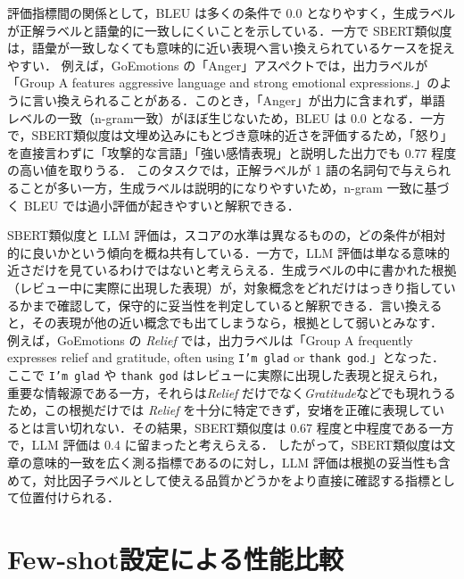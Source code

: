 評価指標間の関係として，BLEU は多くの条件で 0.0 となりやすく，生成ラベルが正解ラベルと語彙的に一致しにくいことを示している．一方で SBERT類似度は，語彙が一致しなくても意味的に近い表現へ言い換えられているケースを捉えやすい．
例えば，GoEmotions の「Anger」アスペクトでは，出力ラベルが「Group A features aggressive language and strong emotional expressions.」のように言い換えられることがある．このとき，「Anger」が出力に含まれず，単語レベルの一致（n-gram一致）がほぼ生じないため，BLEU は 0.0 となる．一方で，SBERT類似度は文埋め込みにもとづき意味的近さを評価するため，「怒り」を直接言わずに「攻撃的な言語」「強い感情表現」と説明した出力でも 0.77 程度の高い値を取りうる．
このタスクでは，正解ラベルが 1 語の名詞句で与えられることが多い一方，生成ラベルは説明的になりやすいため，n-gram 一致に基づく BLEU では過小評価が起きやすいと解釈できる．

SBERT類似度と LLM 評価は，スコアの水準は異なるものの，どの条件が相対的に良いかという傾向を概ね共有している．一方で，LLM 評価は単なる意味的近さだけを見ているわけではないと考えらえる．生成ラベルの中に書かれた根拠（レビュー中に実際に出現した表現）が，対象概念をどれだけはっきり指しているかまで確認して，保守的に妥当性を判定していると解釈できる．言い換えると，その表現が他の近い概念でも出てしまうなら，根拠として弱いとみなす．
例えば，GoEmotions の \textit{Relief} では，出力ラベルは「Group A frequently expresses relief and gratitude, often using \texttt{I'm glad} or \texttt{thank god}.」となった．ここで \texttt{I'm glad} や \texttt{thank god} はレビューに実際に出現した表現と捉えられ，重要な情報源である一方，それらは\textit{Relief} だけでなく\textit{Gratitude}などでも現れうるため，この根拠だけでは \textit{Relief} を十分に特定できず，安堵を正確に表現しているとは言い切れない．その結果，SBERT類似度は 0.67 程度と中程度である一方で，LLM 評価は 0.4 に留まったと考えらえる．
したがって，SBERT類似度は文章の意味的一致を広く測る指標であるのに対し，LLM 評価は根拠の妥当性も含めて，対比因子ラベルとして使える品質かどうかをより直接に確認する指標として位置付けられる．

\section{Few-shot設定による性能比較}
